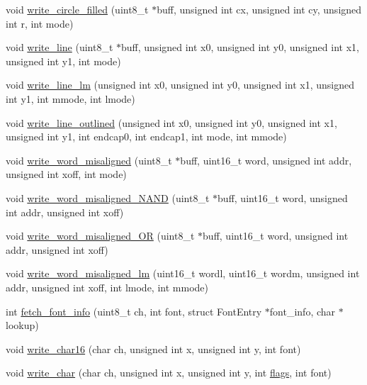 \begin{DoxyCompactItemize}
\item 
void \hyperlink{group___o_s_d_g_e_n_module_gaf369bd7c0a15859e4a35ac7a6bf77263}{write\-\_\-circle\-\_\-filled} (uint8\-\_\-t $\ast$buff, unsigned int cx, unsigned int cy, unsigned int r, int mode)
\item 
void \hyperlink{group___o_s_d_g_e_n_module_ga2fe2ee0f0ff8e34091a5357658c686c1}{write\-\_\-line} (uint8\-\_\-t $\ast$buff, unsigned int x0, unsigned int y0, unsigned int x1, unsigned int y1, int mode)
\item 
void \hyperlink{group___o_s_d_g_e_n_module_ga1b12386d924769809d25c0151ca7d47f}{write\-\_\-line\-\_\-lm} (unsigned int x0, unsigned int y0, unsigned int x1, unsigned int y1, int mmode, int lmode)
\item 
void \hyperlink{group___o_s_d_g_e_n_module_ga27afef3cac2fe7bd07005b4cfdab1297}{write\-\_\-line\-\_\-outlined} (unsigned int x0, unsigned int y0, unsigned int x1, unsigned int y1, int endcap0, int endcap1, int mode, int mmode)
\item 
void \hyperlink{group___o_s_d_g_e_n_module_ga609b93e9b64ad8b92c1c555d3cdb80c5}{write\-\_\-word\-\_\-misaligned} (uint8\-\_\-t $\ast$buff, uint16\-\_\-t word, unsigned int addr, unsigned int xoff, int mode)
\item 
void \hyperlink{group___o_s_d_g_e_n_module_gac311d0b8a75e018101c2f7de25468bce}{write\-\_\-word\-\_\-misaligned\-\_\-\-N\-A\-N\-D} (uint8\-\_\-t $\ast$buff, uint16\-\_\-t word, unsigned int addr, unsigned int xoff)
\item 
void \hyperlink{group___o_s_d_g_e_n_module_ga17f327de483285ee88a844c5b617d1ed}{write\-\_\-word\-\_\-misaligned\-\_\-\-O\-R} (uint8\-\_\-t $\ast$buff, uint16\-\_\-t word, unsigned int addr, unsigned int xoff)
\item 
void \hyperlink{group___o_s_d_g_e_n_module_gaf7b6f5e5e2980741c80f92a24c27d470}{write\-\_\-word\-\_\-misaligned\-\_\-lm} (uint16\-\_\-t wordl, uint16\-\_\-t wordm, unsigned int addr, unsigned int xoff, int lmode, int mmode)
\item 
int \hyperlink{group___o_s_d_g_e_n_module_ga77bb4c9fa18481a38a30c22fc2b8ad68}{fetch\-\_\-font\-\_\-info} (uint8\-\_\-t ch, int font, struct \-Font\-Entry $\ast$font\-\_\-info, char $\ast$lookup)
\item 
void \hyperlink{group___o_s_d_g_e_n_module_gaa298c555d34c7e1929c065b647c0f2c8}{write\-\_\-char16} (char ch, unsigned int x, unsigned int y, int font)
\item 
void \hyperlink{group___o_s_d_g_e_n_module_ga790a5ed0b4f266fd6699d69102a632f4}{write\-\_\-char} (char ch, unsigned int x, unsigned int y, int \hyperlink{uavobjectmanager_8c_a89997860157be94711355010fc2a337d}{flags}, int font)

\end{DoxyCompactItemize}

